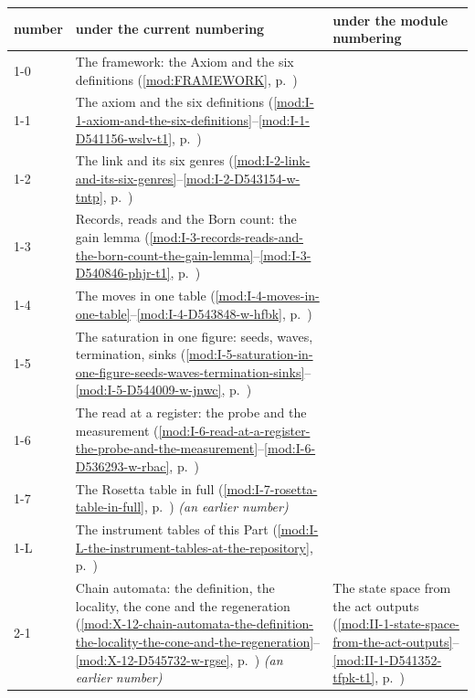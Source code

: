 {\small\begin{longtable}{p{11mm}p{70mm}p{60mm}}
\hline number & under the current numbering & under the module numbering \\ \hline \endhead
1-0 & The framework: the Axiom and the six definitions (\ref{mod:FRAMEWORK}, p.~\pageref{mod:FRAMEWORK}) &  \\
1-1 & The axiom and the six definitions (\ref{mod:I-1-axiom-and-the-six-definitions}--\ref{mod:I-1-D541156-wslv-t1}, p.~\pageref{mod:I-1-axiom-and-the-six-definitions}) &  \\
1-2 & The link and its six genres (\ref{mod:I-2-link-and-its-six-genres}--\ref{mod:I-2-D543154-w-tntp}, p.~\pageref{mod:I-2-link-and-its-six-genres}) &  \\
1-3 & Records, reads and the Born count: the gain lemma (\ref{mod:I-3-records-reads-and-the-born-count-the-gain-lemma}--\ref{mod:I-3-D540846-phjr-t1}, p.~\pageref{mod:I-3-records-reads-and-the-born-count-the-gain-lemma}) &  \\
1-4 & The moves in one table (\ref{mod:I-4-moves-in-one-table}--\ref{mod:I-4-D543848-w-hfbk}, p.~\pageref{mod:I-4-moves-in-one-table}) &  \\
1-5 & The saturation in one figure: seeds, waves, termination, sinks (\ref{mod:I-5-saturation-in-one-figure-seeds-waves-termination-sinks}--\ref{mod:I-5-D544009-w-jnwc}, p.~\pageref{mod:I-5-saturation-in-one-figure-seeds-waves-termination-sinks}) &  \\
1-6 & The read at a register: the probe and the measurement (\ref{mod:I-6-read-at-a-register-the-probe-and-the-measurement}--\ref{mod:I-6-D536293-w-rbac}, p.~\pageref{mod:I-6-read-at-a-register-the-probe-and-the-measurement}) &  \\
1-7 & The Rosetta table in full (\ref{mod:I-7-rosetta-table-in-full}, p.~\pageref{mod:I-7-rosetta-table-in-full}) \emph{(an earlier number)} &  \\
1-L & The instrument tables of this Part (\ref{mod:I-L-the-instrument-tables-at-the-repository}, p.~\pageref{mod:I-L-the-instrument-tables-at-the-repository}) &  \\
2-1 & Chain automata: the definition, the locality, the cone and the regeneration (\ref{mod:X-12-chain-automata-the-definition-the-locality-the-cone-and-the-regeneration}--\ref{mod:X-12-D545732-w-rgse}, p.~\pageref{mod:X-12-chain-automata-the-definition-the-locality-the-cone-and-the-regeneration}) \emph{(an earlier number)} & The state space from the act outputs (\ref{mod:II-1-state-space-from-the-act-outputs}--\ref{mod:II-1-D541352-tfpk-t1}, p.~\pageref{mod:II-1-state-space-from-the-act-outputs}) \\

\end{longtable}}
